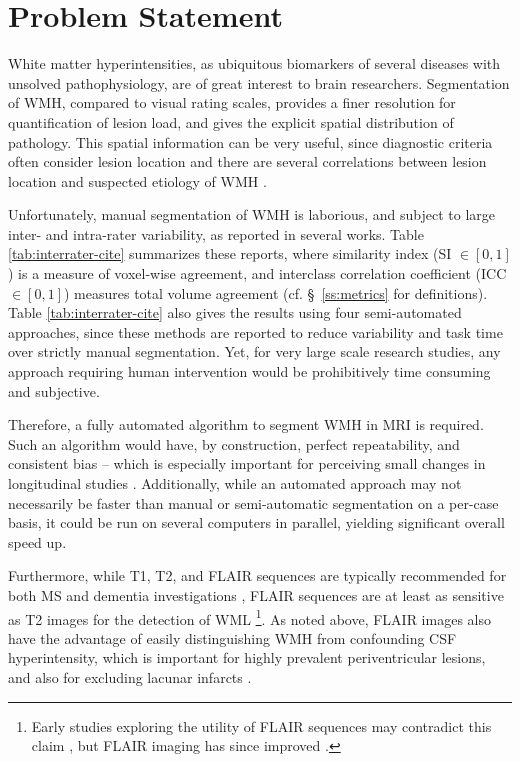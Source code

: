 \section{Problem Statement}
White matter hyperintensities, as ubiquitous biomarkers of several diseases with unsolved pathophysiology, are of great interest to brain researchers.
Segmentation of WMH, compared to visual rating scales, provides a finer resolution for quantification of lesion load, and gives the explicit spatial distribution of pathology.
This spatial information can be very useful, since diagnostic criteria often consider lesion location \cite{Sorbi2012} and there are several correlations between lesion location and suspected etiology of WMH \cite{Kim2008,Wardlaw2015}.
\par
Unfortunately, manual segmentation of WMH is laborious, and subject to large inter- and intra-rater variability, as reported in several works.
Table \ref{tab:interrater-cite} summarizes these reports, where similarity index (SI $\in [0,1]$) is a measure of voxel-wise agreement, and interclass correlation coefficient (ICC $\in [0,1]$) measures total volume agreement (cf. \S\ \ref{ss:metrics} for definitions).
Table \ref{tab:interrater-cite} also gives the results using four semi-automated approaches, since these methods are reported to reduce variability and task time over strictly manual segmentation.
Yet, for very large scale research studies, any approach requiring human intervention would be prohibitively time consuming and subjective.
\par 
Therefore, a fully automated algorithm to segment WMH in MRI is required.
Such an algorithm would have, by construction, perfect repeatability, and consistent bias -- which is especially important for perceiving small changes in longitudinal studies \cite{MSISBI2015}.
Additionally, while an automated approach may not necessarily be faster than manual or semi-automatic segmentation on a per-case basis, it could be run on several computers in parallel, yielding significant overall speed up.
\par
Furthermore, while T1, T2, and FLAIR sequences are typically recommended for both MS and dementia investigations \cite{Simon2006,Wardlaw2013,Traboulsee2015}, FLAIR sequences are at least as sensitive as T2 images for the detection of WML%
\footnote{Early studies exploring the utility of FLAIR sequences may contradict this claim \cite{Okuda1999,Rovaris2000}, but FLAIR imaging has since improved \cite{Wardlaw2015}.}.
As noted above, FLAIR images also have the advantage of easily distinguishing WMH from confounding CSF hyperintensity, which is important for highly prevalent periventricular lesions, and also for excluding lacunar infarcts \cite{Bakshi2001,Barkhof2002}.
